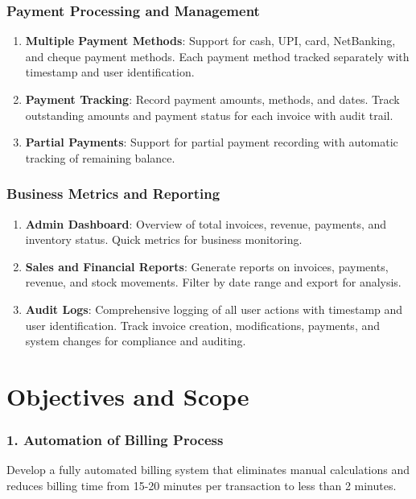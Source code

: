 \documentclass[12pt,a4paper]{report}
\begin{document}
\subsection{Payment Processing and Management}
\begin{enumerate}[label=\roman*)]
    \item \textbf{Multiple Payment Methods}: Support for cash, UPI, card, NetBanking, and cheque payment methods. Each payment method tracked separately with timestamp and user identification.
    \item \textbf{Payment Tracking}: Record payment amounts, methods, and dates. Track outstanding amounts and payment status for each invoice with audit trail.
    \item \textbf{Partial Payments}: Support for partial payment recording with automatic tracking of remaining balance.
\end{enumerate}

\subsection{Business Metrics and Reporting}
\begin{enumerate}[label=\roman*)]
    \item \textbf{Admin Dashboard}: Overview of total invoices, revenue, payments, and inventory status. Quick metrics for business monitoring.
    \item \textbf{Sales and Financial Reports}: Generate reports on invoices, payments, revenue, and stock movements. Filter by date range and export for analysis.
    \item \textbf{Audit Logs}: Comprehensive logging of all user actions with timestamp and user identification. Track invoice creation, modifications, payments, and system changes for compliance and auditing.
\end{enumerate}

\newpage

\chapter{Objectives and Scope}

\subsection{1. Automation of Billing Process}

Develop a fully automated billing system that eliminates manual calculations and reduces billing time from 15-20 minutes per transaction to less than 2 minutes.
\end{document}
